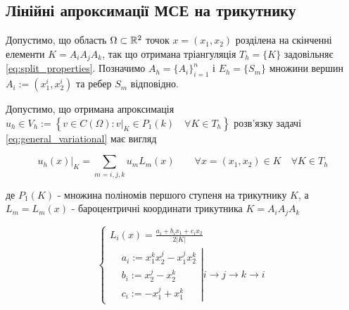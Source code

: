\subsection{Лінійні апроксимації МСЕ на трикутнику}

Допустимо, що область $\Omega \subset \mathbb{R}^2$ точок $x = (x_1, x_2)$ розділена на скінченні елементи $K = A_iA_jA_k$,
 	так що отримана тріангуляція $T_h = \lbrace K \rbrace$ задовільняє \ref{eq:split_properties}.
Позначимо $A_h = \lbrace A_i \rbrace_{i=1}^n$ і $E_h = \lbrace S_m \rbrace$ множини вершин $A_i := (x_1^i, x_2^i)$ та ребер $S_m$ відповідно.

Допустимо, що отримана апроксимація $u_h \in V_h := \left\lbrace v \in C(\Omega) : v|_K \in P_1(k) \quad \forall K \in T_h \right\rbrace$ розв'язку задачі \ref{eq:general_variational} має вигляд

\begin{equation}
	u_h(x)|_K = \sum \limits_{m=i,j,k} u_m L_m (x) \qquad \forall x=(x_1, x_2) \in K \quad \forall K \in T_h
\end{equation}

де $P_1(K)$ - множина поліномів першого ступеня на трикутнику $K$, а $L_m = L_m(x)$ -
	бароцентричні координати трикутника $K = A_i A_j A_k$

\begin{equation}\label{eq:barycentric_coord}
	\begin{cases}
		L_i(x) = \frac{a_i + b_i x_1 + c_i x_2}{2 |K|} \\
			\left.
			\begin{split}
				&a_i := x_1^k x_2^j - x_1^j x_2^k \\
				&b_i := x_2^j -x_2^k \\
				&c_i := -x_1^j+x_1^k
			\end{split}
			\right|
			i \to j \to k \to i
	\end{cases}
\end{equation}

